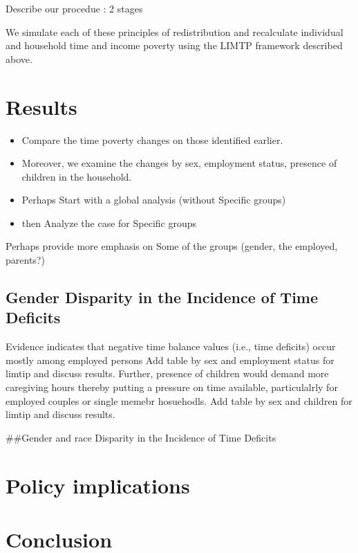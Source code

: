 \documentclass[
  11pt,
]{article}
\begin{document}
Describe our procedue : 2 stages

We simulate each of these principles of redistribution and recalculate
individual and household time and income poverty using the LIMTP
framework described above.

\section{Results}\label{results}

\begin{itemize}
\item
  Compare the time poverty changes on those identified earlier.
\item
  Moreover, we examine the changes by sex, employment status, presence
  of children in the household.
\item
  Perhaps Start with a global analysis (without Specific groups)
\item
  then Analyze the case for Specific groups
\end{itemize}

Perhaps provide more emphasis on Some of the groups (gender, the
employed, parents?)

\subsection{Gender Disparity in the Incidence of Time
Deficits}\label{gender-disparity-in-the-incidence-of-time-deficits}

Evidence indicates that negative time balance values (i.e., time
deficits) occur mostly among employed persons Add table by sex and
employment status for limtip and discuss results. Further, presence of
children would demand more caregiving hours thereby putting a pressure
on time available, particulalrly for employed couples or single memebr
hosuehodls. Add table by sex and children for limtip and discuss
results.

\#\#Gender and race Disparity in the Incidence of Time Deficits

\section{Policy implications}\label{policy-implications}

\section{Conclusion}\label{conclusion}
\end{document}
